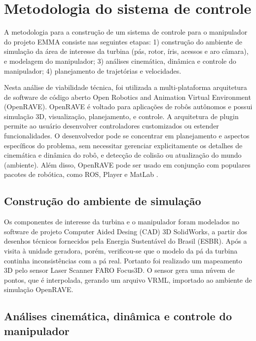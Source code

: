 \section{Metodologia do sistema de controle}
A metodologia para a construção de um sistema de controle para o manipulador do
projeto EMMA consiste nas seguintes etapas: 1) construção do ambiente de
simulação da área de interesse da turbina (pás, rotor, íris, acessos e aro
câmara), e modelagem do manipulador; 3) análises cinemática, dinâmica e
controle do manipulador; 4) planejamento de trajetórias e velocidades.

Nesta análise de viabilidade técnica, foi utilizada a 
multi-plataforma arquitetura de software de código aberto Open
Robotics and Animation Virtual Environment (OpenRAVE). OpenRAVE é voltado para
aplicações de robôs autônomos e possui simulação 3D, visualização, planejamento,
e controle. A arquitetura de plugin permite ao usuário desenvolver controladores
customizados ou estender funcionalidades. O desenvolvedor pode se
concentrar em planejamento e aspectos específicos do problema, sem necessitar
gerenciar explicitamente os detalhes de cinemática e dinâmica do robô, e
detecção de colisão ou atualização do mundo (ambiente). Além disso, OpenRAVE
pode ser usado em conjunção com populares pacotes de robótica, como ROS, Player e MatLab
\cite{diankov2008openrave}. 

\subsection{Construção do ambiente de simulação}

Os componentes de interesse da turbina e o manipulador foram modelados no
software de projeto Computer Aided Desing (CAD) 3D SolidWorks, a partir dos
desenhos técnicos fornecidos pela Energia Sustentável do Brasil (ESBR). Após a visita à unidade geradora, porém,
verificou-se que o modelo da pá da turbina continha inconsistências com a pá
real. Portanto foi realizado um mapeamento 3D pelo sensor Laser Scanner FARO
Focus3D. O sensor gera uma núvem de pontos, que é interpolada, gerando um
arquivo VRML, importado ao ambiente de simulação OpenRAVE.


\subsection{Análises cinemática, dinâmica e
controle do manipulador}

